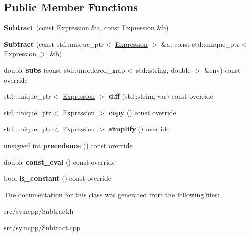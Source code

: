 \subsection*{Public Member Functions}
\begin{DoxyCompactItemize}
\item 
{\bfseries Subtract} (const \hyperlink{classExpression}{Expression} \&a, const \hyperlink{classExpression}{Expression} \&b)\hypertarget{classSubtract_a1c86bd7a12cb41084a042b7c35209026}{}\label{classSubtract_a1c86bd7a12cb41084a042b7c35209026}

\item 
{\bfseries Subtract} (const std\+::unique\+\_\+ptr$<$ \hyperlink{classExpression}{Expression} $>$ \&a, const std\+::unique\+\_\+ptr$<$ \hyperlink{classExpression}{Expression} $>$ \&b)\hypertarget{classSubtract_a9c34b142e40a3210382acfa5ce8f1b27}{}\label{classSubtract_a9c34b142e40a3210382acfa5ce8f1b27}

\item 
double {\bfseries subs} (const std\+::unordered\+\_\+map$<$ std\+::string, double $>$ \&env) const override\hypertarget{classSubtract_a4c09a516ef1e2c302156963af050ff81}{}\label{classSubtract_a4c09a516ef1e2c302156963af050ff81}

\item 
std\+::unique\+\_\+ptr$<$ \hyperlink{classExpression}{Expression} $>$ {\bfseries diff} (std\+::string var) const override\hypertarget{classSubtract_a5448f547bc0a669ce5ea17e262e896f1}{}\label{classSubtract_a5448f547bc0a669ce5ea17e262e896f1}

\item 
std\+::unique\+\_\+ptr$<$ \hyperlink{classExpression}{Expression} $>$ {\bfseries copy} () const override\hypertarget{classSubtract_ab90ba3a949da048a5131f8bfe297e2f2}{}\label{classSubtract_ab90ba3a949da048a5131f8bfe297e2f2}

\item 
std\+::unique\+\_\+ptr$<$ \hyperlink{classExpression}{Expression} $>$ {\bfseries simplify} () override\hypertarget{classSubtract_ac593f205a9baa6ae8236aab33d1a2702}{}\label{classSubtract_ac593f205a9baa6ae8236aab33d1a2702}

\item 
unsigned int {\bfseries precedence} () const override\hypertarget{classSubtract_af33a33e8e10a85827e07affa25870482}{}\label{classSubtract_af33a33e8e10a85827e07affa25870482}

\item 
double {\bfseries const\+\_\+eval} () const override\hypertarget{classSubtract_a7f2a950d7139f10842b87567a83fe0a2}{}\label{classSubtract_a7f2a950d7139f10842b87567a83fe0a2}

\item 
bool {\bfseries is\+\_\+constant} () const override\hypertarget{classSubtract_ac6fdce3f1e928ee5d129ab0f1e3dcaeb}{}\label{classSubtract_ac6fdce3f1e928ee5d129ab0f1e3dcaeb}

\end{DoxyCompactItemize}


The documentation for this class was generated from the following files\+:\begin{DoxyCompactItemize}
\item 
src/symcpp/Subtract.\+h\item 
src/symcpp/Subtract.\+cpp\end{DoxyCompactItemize}
